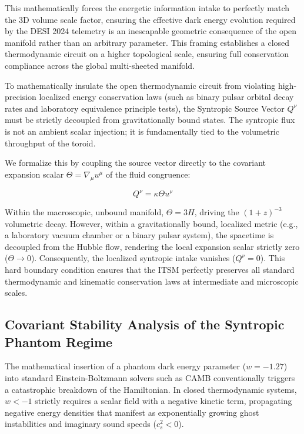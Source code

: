 \documentclass[aps,prd,10pt,twocolumn,superscriptaddress,nofootinbib,floatfix]{revtex4-2}
\begin{document}
This mathematically forces the energetic information intake to perfectly match the 3D volume scale factor, ensuring the effective dark energy evolution required by the DESI 2024 telemetry is an inescapable geometric consequence of the open manifold rather than an arbitrary parameter. This framing establishes a closed thermodynamic circuit on a higher topological scale, ensuring full conservation compliance across the global multi-sheeted manifold.

To mathematically insulate the open thermodynamic circuit from violating high-precision localized energy conservation laws (such as binary pulsar orbital decay rates and laboratory equivalence principle tests), the Syntropic Source Vector $Q^\nu$ must be strictly decoupled from gravitationally bound states. The syntropic flux is not an ambient scalar injection; it is fundamentally tied to the volumetric throughput of the toroid. 

We formalize this by coupling the source vector directly to the covariant expansion scalar $\Theta = \nabla_\mu u^\mu$ of the fluid congruence:

\begin{equation}
Q^\nu = \kappa \Theta u^\nu
\end{equation}

Within the macroscopic, unbound manifold, $\Theta = 3H$, driving the $(1+z)^{-3}$ volumetric decay. However, within a gravitationally bound, localized metric (e.g., a laboratory vacuum chamber or a binary pulsar system), the spacetime is decoupled from the Hubble flow, rendering the local expansion scalar strictly zero ($\Theta \to 0$). Consequently, the localized syntropic intake vanishes ($Q^\nu = 0$). This hard boundary condition ensures that the ITSM perfectly preserves all standard thermodynamic and kinematic conservation laws at intermediate and microscopic scales.

\subsection{Covariant Stability Analysis of the Syntropic Phantom Regime}

The mathematical insertion of a phantom dark energy parameter ($w = -1.27$) into standard Einstein-Boltzmann solvers such as CAMB conventionally triggers a catastrophic breakdown of the Hamiltonian. In closed thermodynamic systems, $w < -1$ strictly requires a scalar field with a negative kinetic term, propagating negative energy densities that manifest as exponentially growing ghost instabilities and imaginary sound speeds ($c_s^2 < 0$).
\end{document}
